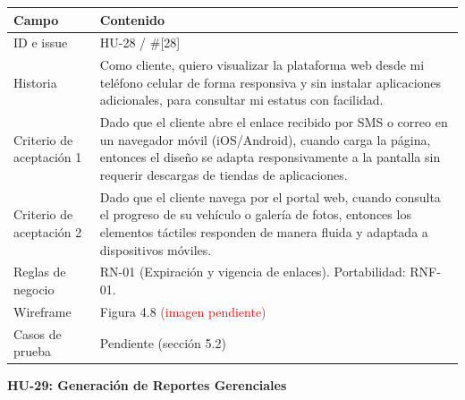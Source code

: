 {\def\LTcaptype{none} %
\begin{longtable}[]{@{}
  >{\raggedright\arraybackslash}p{}
  >{\raggedright\arraybackslash}p{}@{}}
\toprule\noalign{}
\begin{minipage}[b]{\linewidth}\raggedright
\textbf{Campo}
\end{minipage} & \begin{minipage}[b]{\linewidth}\raggedright
\textbf{Contenido}
\end{minipage} \\
\midrule\noalign{}
\endhead
\bottomrule\noalign{}
\endlastfoot
ID e issue & HU-28 / \#{[}28{]} \\
Historia & Como cliente, quiero visualizar la plataforma web desde mi
teléfono celular de forma responsiva y sin instalar aplicaciones
adicionales, para consultar mi estatus con facilidad. \\
Criterio de aceptación 1 & Dado que el cliente abre el enlace recibido
por SMS o correo en un navegador móvil (iOS/Android), cuando carga la
página, entonces el diseño se adapta responsivamente a la pantalla sin
requerir descargas de tiendas de aplicaciones. \\
Criterio de aceptación 2 & Dado que el cliente navega por el portal web,
cuando consulta el progreso de su vehículo o galería de fotos, entonces
los elementos táctiles responden de manera fluida y adaptada a
dispositivos móviles. \\
Reglas de negocio & RN-01 (Expiración y vigencia de enlaces).
Portabilidad: RNF-01. \\
Wireframe & Figura 4.8 \textcolor{red}{(imagen pendiente)} \\
Casos de prueba & Pendiente (sección 5.2) \\
\end{longtable}
}

\textbf{HU-29: Generación de Reportes Gerenciales}

